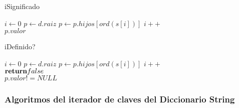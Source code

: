 \begin{algorithm}
\caption{iSignificado}
\label{in diccString(alfa): d, in string: c -> res = alfa}
\begin{algorithmic}
\State $i \gets 0$
\State $p \gets d.raiz$
\State $p \gets p.hijos[ord(s[i])]$
\State $i++$
\EndWhile\\
\Return $p.valor$
\end{algorithmic}
\end{algorithm}

\begin{algorithm}
\caption{iDefinido?}
\label{in diccString: d, in string: c -> res = bool}
\begin{algorithmic}
\State $i \gets 0$
\State $p \gets d.raiz$
\State $p \gets p.hijos[ord(s[i])]$
\State $i++$
\Else \\{$\Return false$}
\EndIf
\EndWhile\\
\Return $p.valor != NULL$
\end{algorithmic}
\end{algorithm}

\subsubsection{Algoritmos del iterador de claves del Diccionario String}


